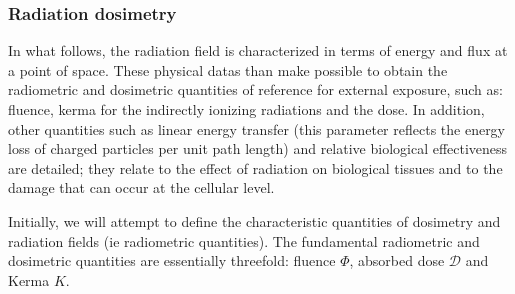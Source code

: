 	\pagebreak
	\subsubsection{Radiation dosimetry}
	In what follows, the radiation field is characterized in terms of energy and flux at a point of space. These physical datas than make possible to obtain the radiometric and dosimetric quantities of reference for external exposure, such as: fluence, kerma for the indirectly ionizing radiations and the dose. In addition, other quantities such as linear energy transfer (this parameter reflects the energy loss of charged particles per unit path length) and relative biological effectiveness are detailed; they relate to the effect of radiation on biological tissues and to the damage that can occur at the cellular level.
	
	Initially, we will attempt to define the characteristic quantities of dosimetry and radiation fields (ie radiometric quantities). The fundamental radiometric and dosimetric quantities are essentially threefold: fluence $\Phi$, absorbed dose $\mathcal{D}$ and Kerma $K$.
	
